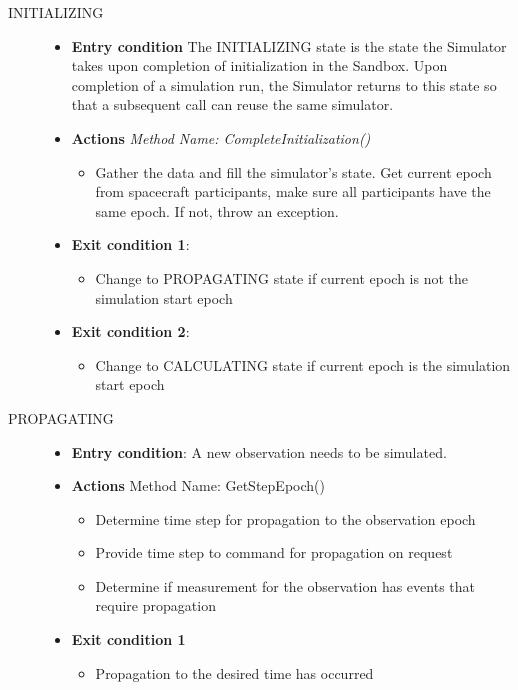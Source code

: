 \begin{description}
\item[INITIALIZING]\hspace{1pt}
\begin{itemize}
\item \textbf{Entry condition}
The INITIALIZING state is the state the Simulator takes upon completion of initialization in the Sandbox.  Upon completion of a simulation run, the Simulator returns to this state so that a subsequent call can reuse the same simulator.
\item \textbf{Actions} \textit{Method Name: CompleteInitialization()}
\begin{itemize}
\item Gather the data and fill the simulator's state.  Get current epoch from spacecraft participants, make sure all participants have the same epoch.  If not, throw an exception.
\end{itemize}
\item \textbf{Exit condition 1}:
\begin{itemize}
\item Change to PROPAGATING state if current epoch is not the simulation start epoch
\end{itemize}
\item \textbf{Exit condition 2}:
\begin{itemize}
\item Change to CALCULATING state if current epoch is the simulation start epoch
\end{itemize}
\end{itemize}
\item [PROPAGATING]\hspace{1pt}
\begin{itemize}
\item \textbf{Entry condition}:  A new observation needs to be simulated.
\item \textbf{Actions}		Method Name:  GetStepEpoch()
\begin{itemize}
\item Determine time step for propagation to the observation epoch
\item Provide time step to command for propagation on request
\item Determine if measurement for the observation has events that require propagation
\end{itemize}
\item \textbf{Exit condition 1}
\begin{itemize}
\item Propagation to the desired time has occurred

\end{itemize}
\end{itemize}
\end{description}
